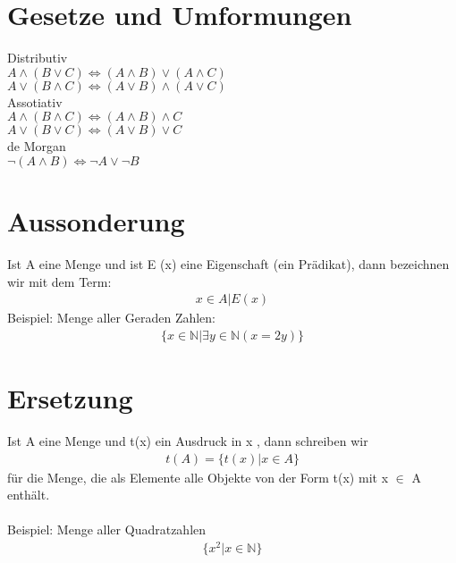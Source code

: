 \section{Gesetze und Umformungen}
Distributiv\\
\(A \wedge (B \vee C) \Leftrightarrow (A \wedge B) \vee (A \wedge C)\)\\
\(A \vee (B \wedge C) \Leftrightarrow (A \vee B) \wedge (A \vee C)\)\\

Assotiativ\\
\(A \wedge (B \wedge C) \Leftrightarrow (A \wedge B) \wedge C\)\\
\(A \vee (B \vee C) \Leftrightarrow (A \vee B) \vee C\)\\

de Morgan\\
\(\neg (A \wedge B) \Leftrightarrow \neg A \vee \neg B\)\\

\section{Aussonderung}
Ist A eine Menge und ist E (x) eine Eigenschaft (ein Prädikat), dann
bezeichnen wir mit dem Term:
\begin{align*}
    x \in A | E(x)
\end{align*}
Beispiel: Menge aller Geraden Zahlen:
\begin{align*}
    \{x \in \mathbb{N} | \exists{y} \in \mathbb{N}(x= 2y)\}
\end{align*}
\section{Ersetzung}
Ist A eine Menge und t(x) ein Ausdruck in x , dann schreiben wir
\begin{align*}
    t(A) = \{t(x) | x \in A\}
\end{align*}
für die Menge, die als Elemente alle Objekte von der Form t(x) mit
x \(\in\) A enthält.\\\\
Beispiel: Menge aller Quadratzahlen
\begin{align*}
    \{x^2 | x \in \mathbb{N}\}
\end{align*}

